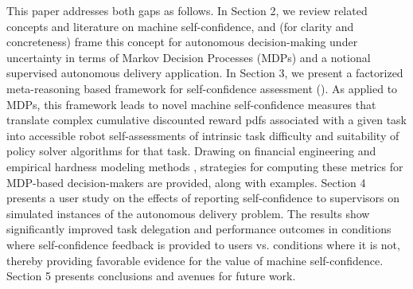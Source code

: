 This paper addresses both gaps as follows. 
In Section 2, we review related concepts and literature on machine self-confidence, and (for clarity and concreteness) frame this concept for autonomous decision-making under uncertainty in terms of Markov Decision Processes (MDPs) and a notional supervised autonomous delivery application. 
In Section 3, we present a factorized meta-reasoning based framework for self-confidence assessment (\famsec). As applied to MDPs, this framework leads to novel machine self-confidence measures that translate complex cumulative discounted reward pdfs associated with a given task into accessible robot self-assessments of intrinsic task difficulty and suitability of policy solver algorithms for that task. 
Drawing on financial engineering \cite{wojt2009portfolio} and empirical hardness modeling methods \cite{Leyton-Brown2009-yr}, strategies for computing these metrics for MDP-based decision-makers are provided, along with examples.  %
Section 4 presents a user study on the effects of reporting self-confidence to supervisors on simulated instances of the autonomous delivery problem. The results show significantly improved task delegation and performance outcomes in conditions where self-confidence feedback is provided to users vs. conditions where it is not, thereby providing favorable evidence for the value of machine self-confidence. Section 5 presents conclusions and avenues for future work. %
